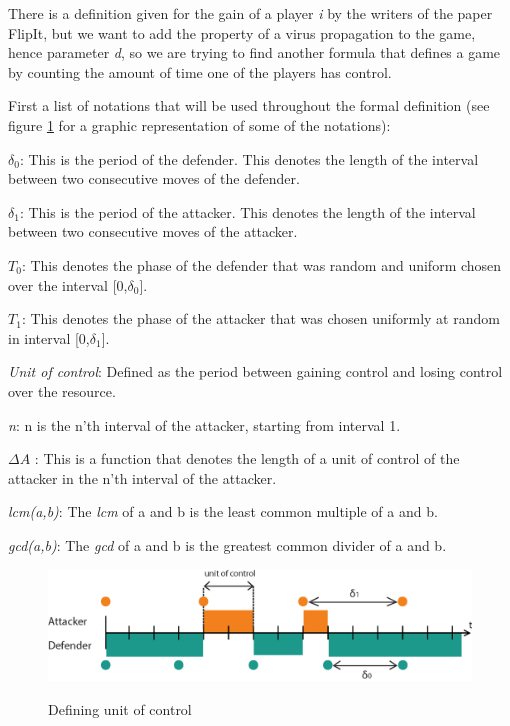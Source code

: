 There is a definition given for the gain of a player \textit{i} by the writers of the paper FlipIt, but we want to add the property of a virus propagation to the game, hence parameter \textit{d}, so we are trying to find another formula that defines a game by counting the amount of time one of the players has control. \\

First a list of notations that will be used throughout the formal definition (see figure \ref{fig:notations} for a graphic representation of some of the notations):
\begin{description}
\item $\delta_{0}$: This is the period of the defender. This denotes the length of the interval between two consecutive moves of the defender. 
\item $\delta_{1}$: This is the period of the attacker. This denotes the length of the interval between two consecutive moves of the attacker.
\item \textit{$T_{0}$}: This denotes the phase of the defender that was random and uniform chosen over the interval [0,$\delta_{0}$].
\item \textit{$T_{1}$}: This denotes the phase of the attacker that was chosen uniformly at random in interval [0,$\delta_{1}$].
\item \textit{Unit of control}: Defined as the period between gaining control and losing control over the resource.  
\item \textit{n}: n is the n'th interval of the attacker, starting from interval 1.
\item $\Delta A$ : This is a function that denotes the length of a unit of control of the attacker in the n'th interval of the attacker.
\item \textit{lcm(a,b)}: The \textit{lcm} of a and b is the least common multiple of a and b.
\item \textit{gcd(a,b)}: The \textit{gcd} of a and b is the greatest common divider of a and b.
\end{description}
\begin{figure}[hbtp]
\caption{Defining unit of control}
\centering
\includegraphics[scale=1]{Images/FlipSpel.png}
\label{fig:notations}
\end{figure}

